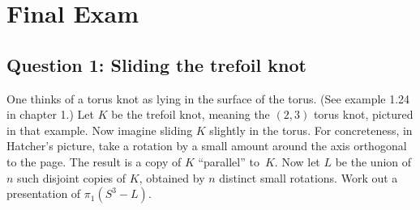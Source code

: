 \section{Final Exam}
\subsection{Question 1: Sliding the trefoil knot}
\begin{prob}
    One thinks of a torus knot as lying in the surface of the torus. (See example 1.24 in chapter 1.)  Let $K$ be the trefoil knot, meaning the $(2,3)$ torus knot, pictured in that example. Now imagine sliding $K$ slightly in the torus.  For concreteness, in Hatcher's picture, take a rotation by a small amount around the axis orthogonal to the page.  The result is a copy of $K$ ``parallel'' to~$K$. Now let $L$ be the union of $n$ such disjoint copies of $K$, obtained by $n$ distinct small rotations.  Work out a presentation of $\pi_1(S^3-L)$.

\end{prob}
